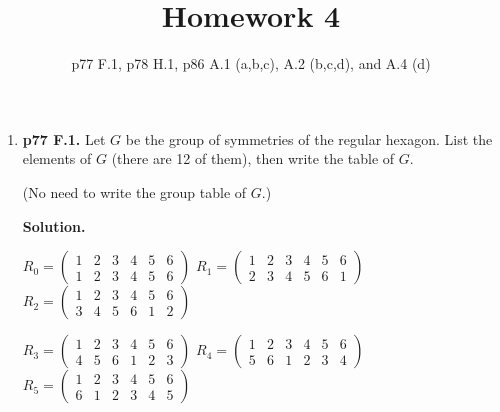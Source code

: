 \documentclass[11pt]{article}
\begin{document}
\title{Homework 4}
\date{p77 F.1, p78 H.1, p86 A.1 (a,b,c), A.2 (b,c,d), and A.4 (d)}
\maketitle

\thispagestyle{fancy}  
\pagestyle{fancy}      

\begin{enumerate}

\item {\bfseries p77 F.1.} Let $G$ be the group of symmetries of the regular hexagon. List the elements of $G$ (there are 12 of them), then write the table of $G$.


	(No need to write the group table of $G$.)
  
	{\bfseries Solution.}
	
	$R_0 = \begin{pmatrix}
		1 & 2 & 3 & 4 & 5 & 6 \\
		1 & 2 & 3 & 4 & 5 & 6
	\end{pmatrix}$
	$R_1 = \begin{pmatrix}
		1 & 2 & 3 & 4 & 5 & 6 \\
		2 & 3 & 4 & 5 & 6 & 1
	\end{pmatrix}$
	$R_2 = \begin{pmatrix}
		1 & 2 & 3 & 4 & 5 & 6 \\
		3 & 4 & 5 & 6 & 1 & 2
	\end{pmatrix}$
	
	$R_3 = \begin{pmatrix}
		1 & 2 & 3 & 4 & 5 & 6 \\
		4 & 5 & 6 & 1 & 2 & 3
	\end{pmatrix}$
	$R_4 = \begin{pmatrix}
		1 & 2 & 3 & 4 & 5 & 6 \\
		5 & 6 & 1 & 2 & 3 & 4
	\end{pmatrix}$
	$R_5 = \begin{pmatrix}
		1 & 2 & 3 & 4 & 5 & 6 \\
		6 & 1 & 2 & 3 & 4 & 5
	\end{pmatrix}$
	

\end{enumerate}
\end{document}

